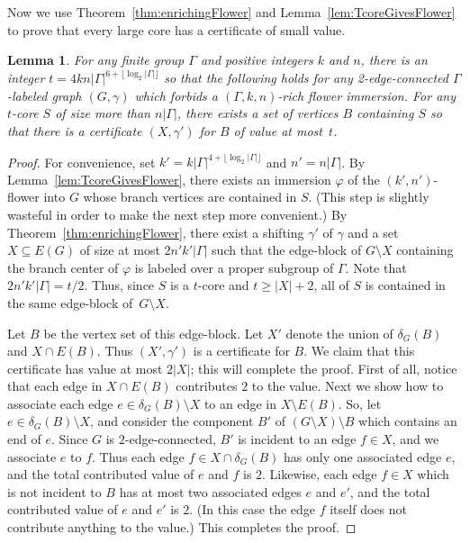 \documentclass[11pt]{article}
\newtheorem{lemma}[thm]{Lemma}
\theoremstyle{definition}
\begin{document}
Now we use Theorem~\ref{thm:enrichingFlower} and Lemma~\ref{lem:TcoreGivesFlower} to prove that every large core has a certificate of small value.


\begin{lemma}
\label{lem:CoresHaveCertificate}
    For any finite group $\Gamma$ and positive integers $k$ and $n$, there is an integer $t=4kn|\Gamma|^{6+\lfloor\log_2|\Gamma|\rfloor}$ so that the following holds for any 2-edge-connected $\Gamma$-labeled graph $(G, \gamma)$ which forbids a $(\Gamma, k, n)$-rich flower immersion. For any $t$-core $S$ of size more than $n|\Gamma|$, there exists a set of vertices $B$ containing $S$ so that there is a certificate $(X, \gamma')$ for $B$ of value at most~$t$.
\end{lemma}
\begin{proof}
    For convenience, set $k' = k|\Gamma|^{4 + \lfloor\log_2 |\Gamma|\rfloor}$ and $n'=n|\Gamma|$. By Lemma~\ref{lem:TcoreGivesFlower}, there exists an immersion $\varphi$ of the $(k', n')$-flower into $G$ whose branch vertices are contained in $S$. (This step is slightly wasteful in order to make the next step more convenient.) By Theorem~\ref{thm:enrichingFlower}, there exist a shifting $\gamma'$ of $\gamma$ and a set $X \subseteq E(G)$ of size at most $2n'k'|\Gamma|$ such that the edge-block of $G \setminus X$ containing the branch center of $\varphi$ is labeled over a proper subgroup of $\Gamma$. Note that $2n'k'|\Gamma|=t/2$. Thus, since $S$ is a $t$-core and $t\geq |X|+2$, all of $S$ is contained in the same edge-block of~$G\setminus X$. 
    
    Let $B$ be the vertex set of this edge-block. Let $X'$ denote the union of $\delta_G(B)$ and $X \cap E(B)$. Thus $(X', \gamma')$ is a certificate for $B$. We claim that this certificate has value at most $2|X|$; this will complete the proof. First of all, notice that each edge in $X \cap E(B)$ contributes $2$ to the value. Next we show how to associate each edge $e \in \delta_G(B)\setminus X$ to an edge in $X \setminus E(B)$. So, let $e \in \delta_G(B)\setminus X$, and consider the component $B'$ of $(G\setminus X) \setminus B$ which contains an end of $e$. Since $G$ is $2$-edge-connected, $B'$ is incident to an edge $f \in X$, and we associate $e$ to $f$. Thus each edge $f \in X \cap \delta_G(B)$ has only one associated edge $e$, and the total contributed value of $e$ and $f$ is $2$. Likewise, each edge $f \in X$ which is not incident to $B$ has at most two associated edges $e$ and $e'$, and the total contributed value of $e$ and $e'$ is $2$. (In this case the edge $f$ itself does not contribute anything to the value.) This completes the proof.
\end{proof}
\end{document}
